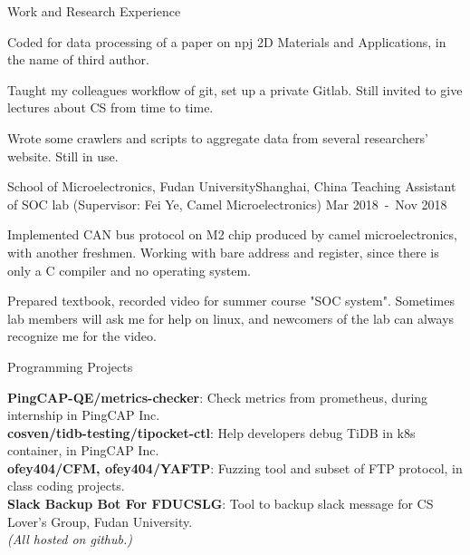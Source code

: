 \documentclass{resume} %
\begin{document}
\begin{rSection}{Work and Research Experience}
\begin{rSubsection}
\item Coded for data processing of a paper on npj 2D Materials and Applications, in the name of third author.
\item Taught my colleagues workflow of git, set up a private Gitlab. Still invited to give lectures about CS from time to time.
\item Wrote some crawlers and scripts to aggregate data from several researchers' website. Still in use.


\end{rSubsection}



\begin{rSubsection}
{School of Microelectronics, Fudan University}{Shanghai, China}
{Teaching Assistant of SOC lab (Supervisor: Fei Ye, Camel Microelectronics)}
{Mar 2018\ -\ Nov 2018}

\item Implemented CAN bus protocol on M2 chip produced by camel microelectronics, with another freshmen. Working with bare address and register, since there is only a C compiler and no operating system.
\item Prepared textbook, recorded video for summer course "SOC system". Sometimes lab members will ask me for help on linux, and newcomers of the lab can always recognize me for the video.
 
\end{rSubsection}



\end{rSection}



\begin{rSection}{Programming Projects }

{\bf PingCAP-QE/metrics-checker}: Check metrics from prometheus, during internship in PingCAP Inc.
\\ {\bf cosven/tidb-testing/tipocket-ctl}: Help developers debug TiDB in k8s container, in PingCAP Inc. 
\\ {\bf ofey404/CFM, ofey404/YAFTP}: Fuzzing tool and subset of FTP protocol, in class coding projects.
\\ {\bf Slack Backup Bot For FDUCSLG}: Tool to backup slack message for CS Lover's Group, Fudan University.
\\ {\em (All hosted on github.)}

\end{rSection}
\end{document}
